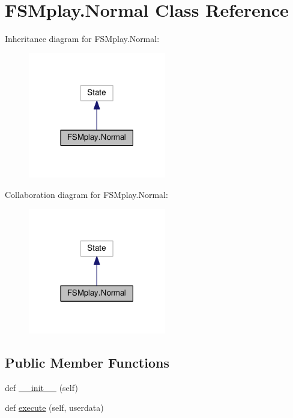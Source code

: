 \hypertarget{classFSMplay_1_1Normal}{}\section{F\+S\+Mplay.\+Normal Class Reference}
\label{classFSMplay_1_1Normal}


Inheritance diagram for F\+S\+Mplay.\+Normal\+:\nopagebreak
\begin{figure}[H]
\begin{center}
\leavevmode
\includegraphics[width=170pt]{classFSMplay_1_1Normal__inherit__graph}
\end{center}
\end{figure}


Collaboration diagram for F\+S\+Mplay.\+Normal\+:\nopagebreak
\begin{figure}[H]
\begin{center}
\leavevmode
\includegraphics[width=170pt]{classFSMplay_1_1Normal__coll__graph}
\end{center}
\end{figure}
\subsection*{Public Member Functions}
\begin{DoxyCompactItemize}
\item 
def \hyperlink{classFSMplay_1_1Normal_a02206ed7d99445b42a37574de2237f34}{\+\_\+\+\_\+init\+\_\+\+\_\+} (self)
\item 
def \hyperlink{classFSMplay_1_1Normal_a3792bdd0853c6220c716d6bc9c73d810}{execute} (self, userdata)
\end{DoxyCompactItemize}
